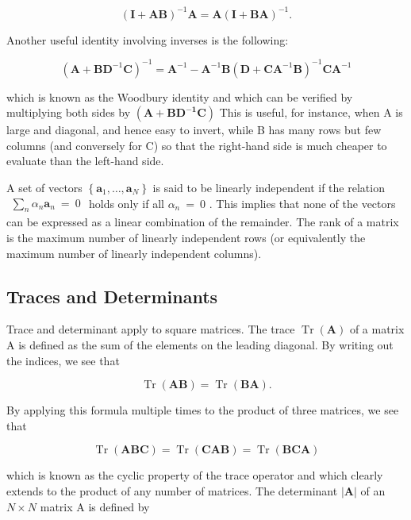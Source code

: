 \documentclass[
  10
]{article}
\begin{document}
\[
(\mathbf {I} + \mathbf {A B}) ^ {- 1} \mathbf {A} = \mathbf {A} (\mathbf {I} + \mathbf {B A}) ^ {- 1}.\tag{C.6}
\]

Another useful identity involving inverses is the following:

\[
(\mathbf {A} + \mathbf {B D} ^ {- 1} \mathbf {C}) ^ {- 1} = \mathbf {A} ^ {- 1} - \mathbf {A} ^ {- 1} \mathbf {B} (\mathbf {D} + \mathbf {C A} ^ {- 1} \mathbf {B}) ^ {- 1} \mathbf {C A} ^ {- 1}\tag{C.7}
\]

which is known as the Woodbury identity and which can be verified by
multiplying both sides by
\(\mathbf { \left( A + B D ^ { - 1 } C \right) }\) This is useful, for
instance, when A is large and diagonal, and hence easy to invert, while
B has many rows but few columns (and conversely for C) so that the
right-hand side is much cheaper to evaluate than the left-hand side.

A set of vectors
\(\left\{ \mathbf { a } _ { 1 } , \ldots , \mathbf { a } _ { N } \right\}\)
is said to be linearly independent if the relation
\(\begin{array} { r } { \sum _ { n } \alpha _ { n } \mathbf { a } _ { n } \ = \ 0 } \end{array}\)
holds only if all \(\alpha _ { n } \ = \ 0\) . This implies that none of
the vectors can be expressed as a linear combination of the remainder.
The rank of a matrix is the maximum number of linearly independent rows
(or equivalently the maximum number of linearly independent columns).

\subsection{Traces and Determinants}\label{traces-and-determinants}

Trace and determinant apply to square matrices. The trace
\(\operatorname { T r } ( \mathbf { A } )\) of a matrix A is defined as
the sum of the elements on the leading diagonal. By writing out the
indices, we see that

\[
\operatorname{Tr} (\mathbf {A B}) = \operatorname{Tr} (\mathbf {B A}).\tag{C.8}
\]

By applying this formula multiple times to the product of three
matrices, we see that

\[
\operatorname{Tr} (\mathbf {A B C}) = \operatorname{Tr} (\mathbf {C A B}) = \operatorname{Tr} (\mathbf {B C A})\tag{C.9}
\]

which is known as the cyclic property of the trace operator and which
clearly extends to the product of any number of matrices. The
determinant \(| \mathbf { A } |\) of an \(N \times N\) matrix A is
defined by
\end{document}

